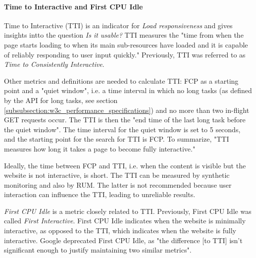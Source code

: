 
\paragraph{Time to Interactive and First CPU Idle} %


Time to Interactive (TTI) is an indicator for \textit{Load responsiveness} and gives insights intto the question \textit{Is it usable?}
TTI measures the "time from when the page starts loading to when its main sub-resources have loaded and it is capable of reliably responding to user input quickly."
Previously, TTI was referred to as \textit{Time to Consistently Interactive}. %

Other metrics and definitions are needed to calculate TTI:
FCP as a starting point and a "quiet window", i.e. a time interval in which no long tasks (as defined by the API for long tasks, see section \ref{subsubsection:w3c_performance_specifications}) and no more than two in-flight GET requests occur.
The TTI is then the "end time of the last long task before the quiet window".
The time interval for the quiet window is set to 5 seconds, and the starting point for the search for TTI is FCP.
To summarize, "TTI measures how long it takes a page to become fully interactive." %

Ideally, the time between FCP and TTI, i.e. when the content is visible but the website is not interactive, is short.
The TTI can be measured by synthetic monitoring and also by RUM.
The latter is not recommended because user interaction can influence the TTI, leading to unreliable results.


\textit{First CPU Idle} is a metric closely related to TTI.
Previously, First CPU Idle was called \textit{First Interactive}. %
First CPU Idle indicates when the website is minimally interactive, as opposed to the TTI, which indicates when the website is fully interactive.
Google deprecated First CPU Idle, as "the difference [to TTI] isn't significant enough to justify maintaining two similar metrics". %

